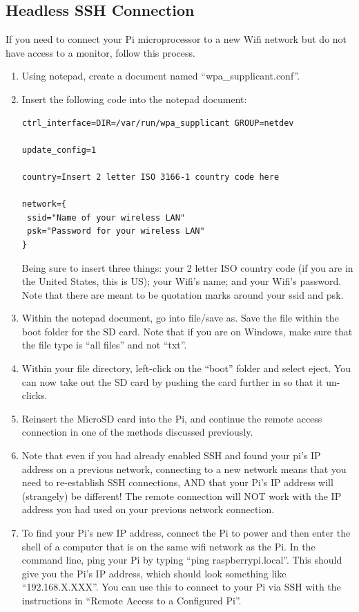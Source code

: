 \documentclass{article}\usepackage[]{graphicx}\usepackage[]{color}
\begin{document}
\subsection{Headless SSH Connection}

If you need to connect your Pi microprocessor to a new Wifi network but do not have access to a monitor, follow this process. 

\begin{enumerate}



\item Using notepad, create a document named ``wpa\_supplicant.conf''. 

\item Insert the following code into the notepad document:

\begin{lstlisting}
ctrl_interface=DIR=/var/run/wpa_supplicant GROUP=netdev

update_config=1

country=Insert 2 letter ISO 3166-1 country code here

network={
 ssid="Name of your wireless LAN"
 psk="Password for your wireless LAN"
}
\end{lstlisting}

Being sure to insert three things: your 2 letter ISO country code (if you are in the United States, this is US); your Wifi's name; and your Wifi's password.  Note that there are meant to be quotation marks around your ssid and psk.

\item Within the notepad document, go into file/save as.  Save the file within the boot folder for the SD card.  Note that if you are on Windows, make sure that the file type is ``all files'' and not ``txt''.

\item Within your file directory, left-click on the ``boot'' folder and select eject.  You can now take out the SD card by pushing the card further in so that it un-clicks.

\item Reinsert the MicroSD card into the Pi, and continue the remote access connection in one of the methods discussed previously.

\item Note that even if you had already enabled SSH and found your pi's IP address on a previous network, connecting to a new network means that you need to re-establish SSH connections, AND that your Pi's IP address will (strangely) be different!  The remote connection will NOT work with the IP address you had used on your previous network connection.

\item To find your Pi's new IP address, connect the Pi to power and then enter the shell of a computer that is on the same wifi network as the Pi.  In the command line, ping your Pi by typing ``ping raspberrypi.local''.  This should give you the Pi's IP address, which should look something like ``192.168.X.XXX''.  You can use this to connect to your Pi via SSH with the instructions in ``Remote Access to a Configured Pi''.

\end{enumerate}
\end{document}
